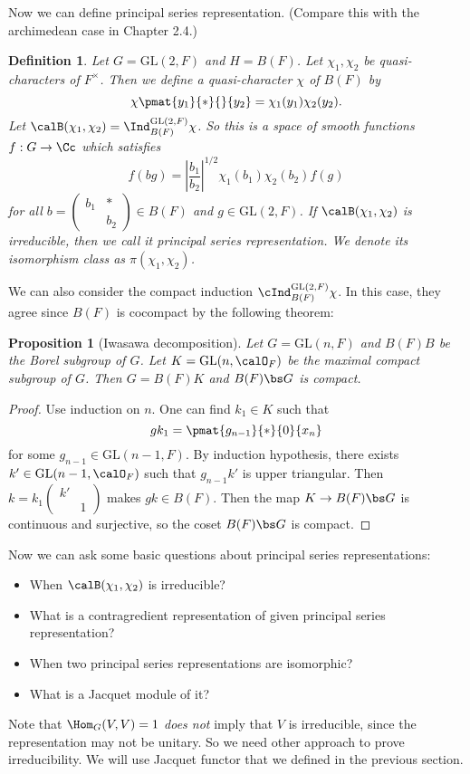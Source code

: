 \documentclass{article}
\newtheorem{definition}{Definition}[section]
\newcommand{\GL}{\mathrm{GL}}
\newcommand{\smat}[4]{\left(\begin{smallmatrix} #1 & #2 \\ #3 & #4 \end{smallmatrix}\right)}
\newtheorem{proposition}{Proposition}[section]
\begin{document}
Now we can define principal series representation. (Compare this with the archimedean case in Chapter 2.4.)
\begin{definition}
Let $G = \GL(2, F)$ and $H = B(F)$. 
Let $\chi_1, \chi_2$ be quasi-characters of $F^{\times}$. 
Then we define a quasi-character $\chi$ of $B(F)$ by 
$$
\chi\pmat{y_1}{*}{}{y_2} = \chi_1(y_1)\chi_2(y_2).
$$
Let $\calB(\chi_1, \chi_2) = \Ind_{B(F)}^{\GL(2, F)} \chi$. 
So this is a space of smooth functions $f:G\to \Cc$ which satisfies 
$$
f(bg) = \left| \frac{b_{1}}{b_{2}}\right|^{1/2} \chi_{1}(b_{1})\chi_{2}(b_{2})f(g)
$$
for all $b = \smat{b_{1}}{*}{}{b_{2}}\in B(F)$ and $g\in \GL(2, F)$. 
If $\calB(\chi_1, \chi_2)$ is irreducible, then we call it principal series representation. We denote its isomorphism class as $\pi(\chi_1, \chi_2)$. 
\end{definition}
We can also consider the compact induction $\cInd_{B(F)}^{\GL(2, F)}\chi$. In this case, they agree since $B(F)$ is cocompact by the following theorem:
\begin{proposition}[Iwasawa decomposition]
Let $G = \GL(n, F)$ and $B(F)B$ be the Borel subgroup of $G$. 
Let $K = \GL(n, \calO_{F})$ be the maximal compact subgroup of $G$. 
Then $G = B(F)K$ and $B(F)\bs G$ is compact. 
\end{proposition}
\begin{proof}
Use induction on $n$. One can find $k_1\in K$ such that 
$$
gk_{1} =\pmat{g_{n-1}}{*}{0}{x_{n}}
$$
for some $g_{n-1}\in \GL(n-1, F)$. By induction hypothesis, there exists $k'\in \GL(n-1, \calO_F)$ such that $g_{n-1}k'$ is upper triangular. Then $k = k_1 \smat{k'}{}{}{1}$ makes $gk \in B(F)$. 
Then the map $K \to B(F)\bs G$ is continuous and surjective, so the coset $B(F)\bs G$ is compact. 
\end{proof}

Now we can ask some basic questions about principal series representations: 
\begin{itemize}
\item When $\calB(\chi_{1}, \chi_2)$ is irreducible?
\item What is a contragredient representation of given principal series representation?
\item When two principal series representations are isomorphic?
\item What is a Jacquet module of it?
\end{itemize}

Note that $\Hom_G(V, V) =1$ \emph{does not} imply that $V$ is irreducible, since the representation may not be unitary. So we need other approach to prove irreducibility. 
We will use Jacquet functor that we defined in the previous section. 
\end{document}

